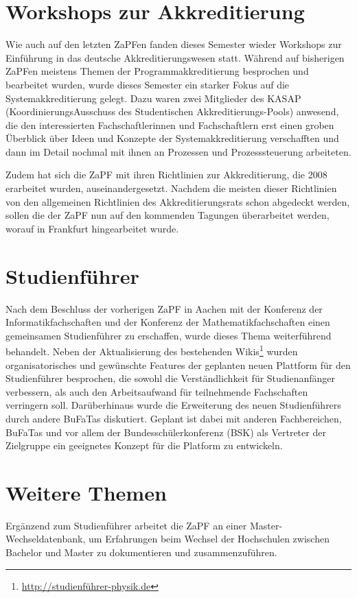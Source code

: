 \section*{Workshops zur Akkreditierung}
Wie auch auf den letzten ZaPFen fanden dieses Semester wieder Workshops zur Einführung in das deutsche Akkreditierungswesen statt. Während auf bisherigen ZaPFen meistens Themen der Programmakkreditierung besprochen und bearbeitet wurden, wurde dieses Semester ein starker Fokus auf die Systemakkreditierung gelegt. Dazu waren zwei Mitglieder des KASAP (KoordinierungsAusschuss des Studentischen Akkreditierungs-Pools) anwesend, die den interessierten Fachschaftlerinnen und Fachschaftlern erst einen groben Überblick über Ideen und Konzepte der Systemakkreditierung verschafften und dann im Detail nochmal mit ihnen an Prozessen und Prozesssteuerung arbeiteten.

Zudem hat sich die ZaPF mit ihren Richtlinien zur Akkreditierung, die 2008 erarbeitet wurden, auseinandergesetzt. Nachdem die meisten dieser Richtlinien von den allgemeinen Richtlinien des Akkreditierungsrats schon abgedeckt werden, sollen die der ZaPF nun auf den kommenden Tagungen überarbeitet werden, worauf in Frankfurt hingearbeitet wurde.

\section*{Studienführer}
Nach dem Beschluss der vorherigen ZaPF in Aachen mit der Konferenz der Informatikfachschaften und der Konferenz der Mathematikfachschaften einen gemeinsamen Studienführer zu  erschaffen, wurde dieses Thema weiterführend behandelt. Neben der Aktualisierung des bestehenden Wikis\footnote{\url{http://studienführer-physik.de}} wurden organisatorisches und gewünschte Features der geplanten neuen Plattform für den Studienführer besprochen, die sowohl die Verständlichkeit für Studienanfänger verbessern, als auch den Arbeitsaufwand für teilnehmende Fachschaften verringern soll. Darüberhinaus wurde die Erweiterung des neuen Studienführers durch andere BuFaTas diskutiert. Geplant ist dabei  mit anderen Fachbereichen, BuFaTas und vor allem der Bundesschülerkonferenz (BSK) als Vertreter der Zielgruppe ein geeignetes Konzept für die Platform zu entwickeln.

\section*{Weitere Themen}
Ergänzend zum Studienführer arbeitet die ZaPF an einer Master-Wechseldatenbank, um Erfahrungen beim Wechsel der Hochschulen zwischen Bachelor und Master zu dokumentieren und zusammenzuführen.

